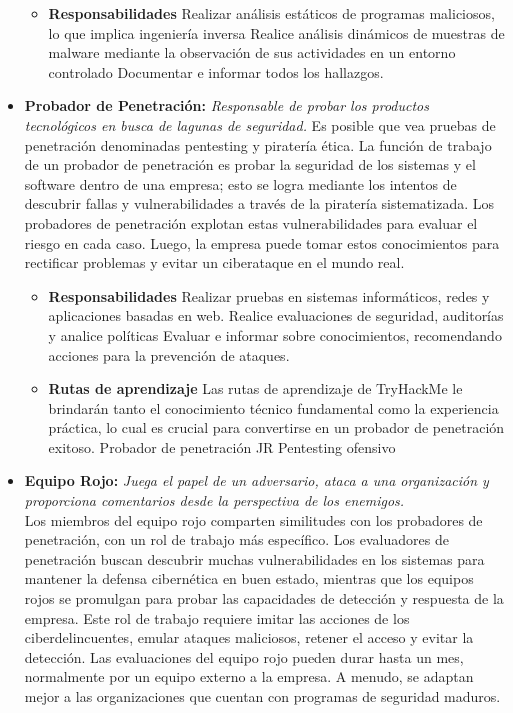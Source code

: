 \begin{itemize}
\begin{itemize}\item \textbf{Responsabilidades}
Realizar análisis estáticos de programas maliciosos, lo que implica ingeniería inversa
Realice análisis dinámicos de muestras de malware mediante la observación de sus actividades en un entorno controlado
Documentar e informar todos los hallazgos.
\end{itemize}
\item \textbf{Probador de Penetración:} \textit{Responsable de probar los productos tecnológicos en busca de lagunas de seguridad.} Es posible que vea pruebas de penetración denominadas pentesting y piratería ética. La función de trabajo de un probador de penetración es probar la seguridad de los sistemas y el software dentro de una empresa; esto se logra mediante los intentos de descubrir fallas y vulnerabilidades a través de la piratería sistematizada. Los probadores de penetración explotan estas vulnerabilidades para evaluar el riesgo en cada caso. Luego, la empresa puede tomar estos conocimientos para rectificar problemas y evitar un ciberataque en el mundo real.
\\

\begin{itemize}\item \textbf{Responsabilidades}
Realizar pruebas en sistemas informáticos, redes y aplicaciones basadas en web.
Realice evaluaciones de seguridad, auditorías y analice políticas
Evaluar e informar sobre conocimientos, recomendando acciones para la prevención de ataques.\\
\item \textbf{Rutas de aprendizaje}
Las rutas de aprendizaje de TryHackMe le brindarán tanto el conocimiento técnico fundamental como la experiencia práctica, lo cual es crucial para convertirse en un probador de penetración exitoso.
Probador de penetración JR
Pentesting ofensivo
\end{itemize}
\item \textbf{Equipo Rojo: }\textit{Juega el papel de un adversario, ataca a una organización y proporciona comentarios desde la perspectiva de los enemigos.} \\
Los miembros del equipo rojo comparten similitudes con los probadores de penetración, con un rol de trabajo más específico. Los evaluadores de penetración buscan descubrir muchas vulnerabilidades en los sistemas para mantener la defensa cibernética en buen estado, mientras que los equipos rojos se promulgan para probar las capacidades de detección y respuesta de la empresa. Este rol de trabajo requiere imitar las acciones de los ciberdelincuentes, emular ataques maliciosos, retener el acceso y evitar la detección. Las evaluaciones del equipo rojo pueden durar hasta un mes, normalmente por un equipo externo a la empresa. A menudo, se adaptan mejor a las organizaciones que cuentan con programas de seguridad maduros.\\
%


\end{itemize}
